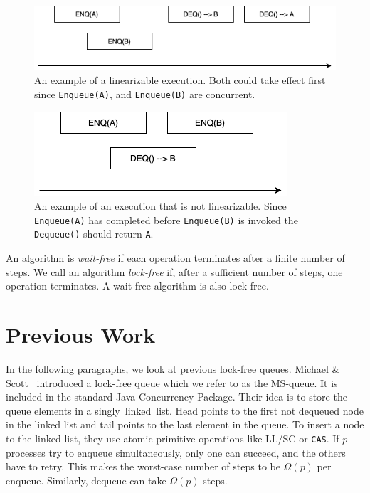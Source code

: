 \documentclass[12pt]{article}
\begin{document}
\begin{figure}[hbt]
  \center\includegraphics[scale=0.5]{pics/good}
  \caption{\label{fig::goodexample}An example of a linearizable execution. Both could take effect first since \texttt{Enqueue(A)}, and \texttt{Enqueue(B)} are concurrent.}
\end{figure}

\begin{figure}[hbt]
  \center\includegraphics[scale=0.5]{pics/bad}
  \caption{\label{fig::badexample}An example of an execution that is not linearizable. Since \texttt{Enqueue(A)} has completed before \texttt{Enqueue(B)} is invoked the \texttt{Dequeue()} should return \texttt{A}.}
\end{figure}


An algorithm is \textit{wait-free} if each operation terminates after a finite number of steps. We call an algorithm \textit{lock-free} if, after a sufficient number of steps, one operation terminates. A wait-free algorithm is also lock-free.


\section{Previous Work}

In the following paragraphs, we look at previous lock-free queues.
Michael \& Scott~\cite{DBLP:conf/podc/MichaelS96} introduced a lock-free queue which we refer to as the MS-queue. It is included in the standard Java Concurrency Package. Their idea is to store the queue elements in a singly~linked~list. Head points to the first not dequeued node in the linked list and tail points to the last element in the queue. To insert a node to the linked list, they use atomic primitive operations like LL/SC or \texttt{CAS}. If $p$ processes try to enqueue simultaneously, only one can succeed, and the others have to retry. This makes the worst-case number of steps to be $\Omega(p)$ per enqueue. Similarly, dequeue can take $\Omega(p)$ steps.
\end{document}
